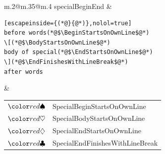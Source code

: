 \begin{longtable}{m{}@{\hspace{.75cm}}m{}@{}m{}}
		specialBeginEnd &
		\begin{lstlisting}[escapeinside={(*@}{@*)},nolol=true]
before words(*@$\BeginStartsOnOwnLine$@*)
\[(*@$\BodyStartsOnOwnLine$@*)
body of special(*@$\EndStartsOnOwnLine$@*)
\](*@$\EndFinishesWithLineBreak$@*)
after words
  \end{lstlisting}
		&
		\begin{tabular}[t]{c@{~}l@{}}
			$\BeginStartsOnOwnLine$     & SpecialBeginStartsOnOwnLine     \\
			$\BodyStartsOnOwnLine$      & SpecialBodyStartsOnOwnLine      \\
			$\EndStartsOnOwnLine$       & SpecialEndStartsOnOwnLine       \\
			$\EndFinishesWithLineBreak$ & SpecialEndFinishesWithLineBreak \\
		\end{tabular}
		\\
		\bottomrule
	\end{longtable}
